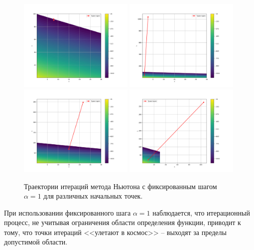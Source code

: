 \documentclass[a4paper,12pt]{article}
\begin{document}
\begin{figure}[H]
    \centering
    \includegraphics[width=0.49\textwidth]{images/newton_fixed_trajectory_0.png}
    \includegraphics[width=0.49\textwidth]{images/newton_fixed_trajectory_1.png}
    \includegraphics[width=0.49\textwidth]{images/newton_fixed_trajectory_2.png}
    \includegraphics[width=0.49\textwidth]{images/newton_fixed_trajectory_3.png}
    \caption{Траектории итераций метода Ньютона с фиксированным шагом \(\alpha=1\) для различных начальных точек.}
\end{figure}
\noindent При использовании фиксированного шага \(\alpha=1\) наблюдается, что итерационный процесс, не учитывая ограничения области определения функции, приводит к тому, что точки итераций <<улетают в космос>> – выходят за пределы допустимой области.
\end{document}

